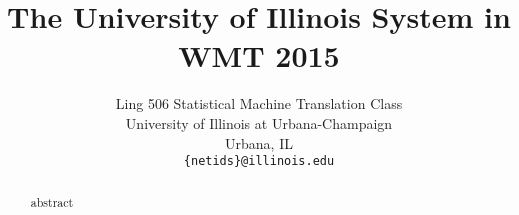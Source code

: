 \documentclass[11pt,letterpaper]{article}
\title{The University of Illinois System in WMT 2015} %
\author{Ling 506 Statistical Machine Translation Class\\
        University of Illinois at Urbana-Champaign\\
        Urbana, IL\\
        {\tt \{netids\}@illinois.edu}}
\begin{document}
\maketitle
\begin{abstract}
    abstract
\end{abstract}



%
%
\end{document}
